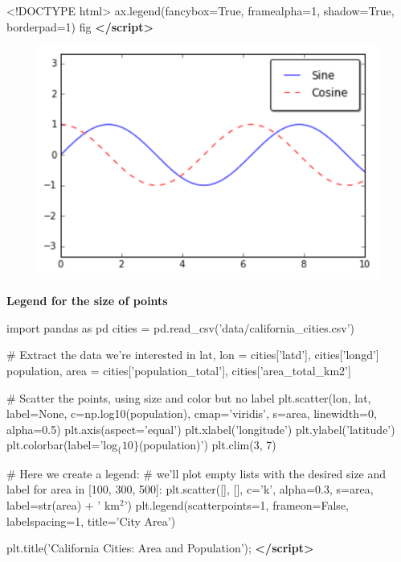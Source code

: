 \documentclass[]{book}
\newenvironment{Shaded}{\begin{snugshade}}{\end{snugshade}}
\newcommand{\KeywordTok}[1]{\textcolor[rgb]{0.13,0.29,0.53}{\textbf{#1}}}
\newcommand{\DataTypeTok}[1]{\textcolor[rgb]{0.13,0.29,0.53}{#1}}
\newcommand{\NormalTok}[1]{#1}
\theoremstyle{definition}
\theoremstyle{definition}
\theoremstyle{definition}
\theoremstyle{remark}
\begin{document}
\begin{Shaded}
\begin{Highlighting}[]
\DataTypeTok{<!DOCTYPE }\NormalTok{html}\DataTypeTok{>}
\NormalTok{ax.legend(fancybox=True, framealpha=1, shadow=True, borderpad=1)}
\NormalTok{fig}
\KeywordTok{</script>}
\end{Highlighting}
\end{Shaded}

\begin{figure}
\centering
\includegraphics{images/legend3.png}
\caption{}
\end{figure}

\textbf{Legend for the size of points}

\begin{Shaded}
\begin{Highlighting}[]
\NormalTok{import pandas as pd}
\NormalTok{cities = pd.read_csv('data/california_cities.csv')}

\NormalTok{# Extract the data we're interested in}
\NormalTok{lat, lon = cities['latd'], cities['longd']}
\NormalTok{population, area = cities['population_total'], cities['area_total_km2']}

\NormalTok{# Scatter the points, using size and color but no label}
\NormalTok{plt.scatter(lon, lat, label=None,}
\NormalTok{            c=np.log10(population), cmap='viridis',}
\NormalTok{            s=area, linewidth=0, alpha=0.5)}
\NormalTok{plt.axis(aspect='equal')}
\NormalTok{plt.xlabel('longitude')}
\NormalTok{plt.ylabel('latitude')}
\NormalTok{plt.colorbar(label='log$_\{10\}$(population)')}
\NormalTok{plt.clim(3, 7)}

\NormalTok{# Here we create a legend:}
\NormalTok{# we'll plot empty lists with the desired size and label}
\NormalTok{for area in [100, 300, 500]:}
\NormalTok{    plt.scatter([], [], c='k', alpha=0.3, s=area,}
\NormalTok{                label=str(area) + ' km$^2$')}
\NormalTok{plt.legend(scatterpoints=1, frameon=False, labelspacing=1, title='City Area')}

\NormalTok{plt.title('California Cities: Area and Population');}
\KeywordTok{</script>}
\end{Highlighting}
\end{Shaded}
\end{document}

